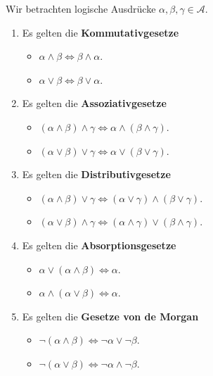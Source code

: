 \begin{satz}\label{logik_regeln_kombi} Wir betrachten logische Ausdrücke $\alpha, \beta, \gamma \in \mathcal{A}$. 

\begin{enumerate}
\item Es gelten die \textbf{Kommutativgesetze}

\begin{itemize}
\item $\alpha \wedge \beta \iff \beta \wedge \alpha $.
\item $\alpha \vee \beta \iff \beta \vee \alpha$.
\end{itemize}

\item Es gelten die \textbf{Assoziativgesetze}

\begin{itemize}
\item $(\alpha \wedge \beta) \wedge \gamma \iff \alpha \wedge (\beta \wedge \gamma)$.
\item $(\alpha \vee \beta) \vee \gamma \iff \alpha \vee (\beta \vee \gamma)$.
\end{itemize}

\item Es gelten die \textbf{Distributivgesetze}

\begin{itemize}
\item $(\alpha \wedge \beta) \vee \gamma \iff (\alpha \vee \gamma) \wedge (\beta \vee \gamma)$.
\item $(\alpha \vee \beta) \wedge \gamma \iff (\alpha \wedge \gamma) \vee (\beta \wedge \gamma)$.
\end{itemize}

\item Es gelten die \textbf{Absorptionsgesetze}

\begin{itemize}
\item $\alpha \vee (\alpha \wedge \beta) \iff \alpha $.
\item $\alpha \wedge (\alpha \vee \beta)  \iff \alpha $.
\end{itemize}

\item Es gelten die \textbf{Gesetze von de Morgan}

\begin{itemize}
\item $\neg(\alpha \wedge \beta)  \iff  \neg \alpha \vee \neg \beta $.
\item $\neg(\alpha \vee \beta)  \iff \neg \alpha \wedge \neg \beta $.
\end{itemize}


\end{enumerate}
\end{satz}
